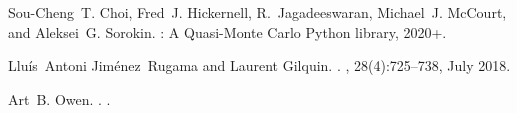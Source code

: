 {%
% 
%
% 
\begin{thebibliography}{1}

Sou-Cheng~T. Choi, Fred~J. Hickernell, R.~Jagadeeswaran, Michael~J. McCourt,
  and Aleksei~G. Sorokin.
: A {Q}uasi-{M}onte {C}arlo {P}ython library, 2020+.

Llu{\'i}s~Antoni Jim{\'e}nez~Rugama and Laurent Gilquin.
.
, 28(4):725--738, July 2018.

Art~B. Owen.
.
.


\end{thebibliography}
}  %
